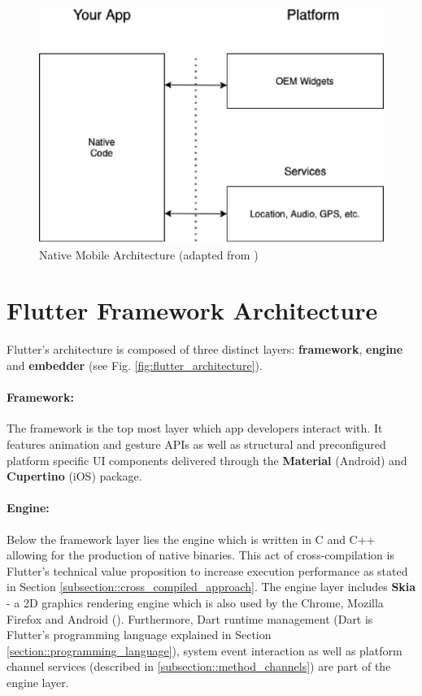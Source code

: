 \begin{figure}
    \centering
    \includegraphics[width=.7\linewidth]{images/architectures/native_architecture.eps}
    \caption{Native Mobile Architecture (adapted from \cite{Cunha2018})}
    \label{fig:native_architecture}
\end{figure}

\section{Flutter Framework Architecture} \label{section::flutter_architecture}
Flutter's architecture is composed of three distinct layers: \textbf{framework}, \textbf{engine} and \textbf{embedder} (see Fig. \ref{fig:flutter_architecture}).
\paragraph*{Framework:}
The framework is the top most layer which app developers interact with. It features animation and gesture APIs as well as structural and preconfigured platform specific UI components delivered through
the \textbf{Material} (Android) and \textbf{Cupertino} (iOS) package.
\paragraph*{Engine:}
Below the framework layer lies the engine which is written in C and C++ allowing for the production of native binaries. 
This act of cross-compilation is Flutter's technical value proposition to increase execution performance as stated in 
Section \ref{subsection::cross_compiled_approach}. The engine layer includes \textbf{Skia} - a 2D graphics rendering engine which is also used by the Chrome, Mozilla Firefox and Android (\cite{Skia2021}).
Furthermore, Dart runtime management (Dart is Flutter's programming language explained in Section \ref{section::programming_language}), system event interaction as well as platform channel services (described in \ref{subsection::method_channels}) are part of the engine layer.
